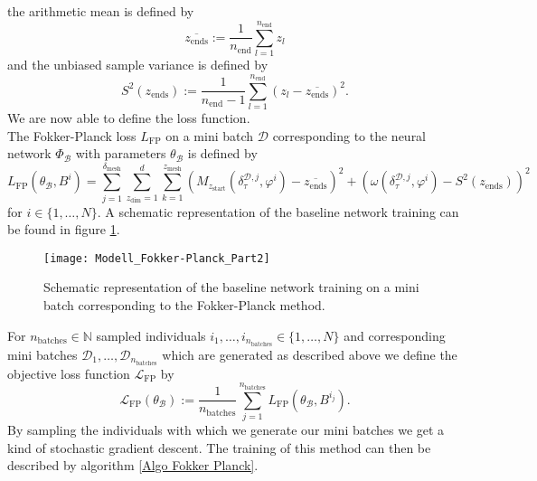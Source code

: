 \documentclass[11pt,titlepage]{article}
\newcommand{\N}{\mathbb{N}} %
\theoremstyle{definition}
\theoremstyle{remark}
\begin{document}
	the arithmetic mean is defined by
	\[\overline{z_\mathrm{ends}}:= \frac{1}{n_\mathrm{end}}\sum_{l=1}^{n_\mathrm{end}}z_l\]
	and the unbiased sample variance is defined by
	\[S^2(z_\mathrm{ends}):= \frac{1}{n_\mathrm{end}-1}\sum_{l=1}^{n_\mathrm{end}}(z_l - \overline{z_\mathrm{ends}})^2.\]
	We are now able to define the loss function. \\
	The Fokker-Planck loss $L_\mathrm{FP}$ on a mini batch $\mathcal{D}$ corresponding to the neural network $\Phi_\mathcal{B}$ with parameters $\theta_\mathcal{B}$ is defined by
	\[L_\mathrm{FP}(\theta_\mathcal{B}, B^i)=\sum_{j=1}^{\delta_\mathrm{mesh}}\sum_{z_\mathrm{dim} = 1}^d \sum_{k=1}^{z_\mathrm{mesh}} \left(M_{z_\mathrm{start}}(\delta_\tau^{\mathcal{D},j}, \varphi^i)-\overline{z_\mathrm{ends}}\right)^2 + \left(\omega(\delta_\tau^{\mathcal{D},j}, \varphi^i)- S^2(z_\mathrm{ends})\right)^2\]
	for $i\in \{1,\ldots, N\}$. A schematic representation of the baseline network training can be found in figure \ref{Abb model FP part 2}.
	
	\begin{figure}[h!]
		\centering
		\texttt{[image: Modell\_Fokker-Planck\_Part2]}
		\caption{Schematic representation of the baseline network training on a mini batch corresponding to the Fokker-Planck method.}
		\label{Abb model FP part 2}
	\end{figure}
	
	For $n_\mathrm{batches}\in\N$ sampled individuals $i_1,\ldots,i_{n_\mathrm{batches}}\in\{1,\ldots,N\}$ and corresponding mini batches $\mathcal{D}_1,\ldots,\mathcal{D}_{n_\mathrm{batches}}$ which are generated as described above we define the objective loss function $\mathcal{L}_\mathrm{FP}$ by
	\[\mathcal{L}_\mathrm{FP}(\theta_\mathcal{B}):= \frac{1}{n_\mathrm{batches}}\sum_{j=1}^{n_\mathrm{batches}}L_\mathrm{FP}(\theta_\mathcal{B},B^{i_j}).\]
	By sampling the individuals with which we generate our mini batches we get a kind of stochastic gradient descent. The training of this method can then be described by algorithm \ref{Algo Fokker Planck}.
	
\end{document}
